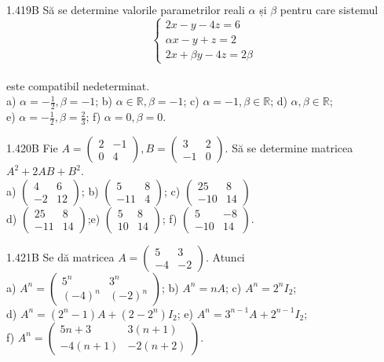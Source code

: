 \documentclass[11pt]{article}
\begin{document}
1.419B Să se determine valorile parametrilor reali $\alpha$ și $\beta$ pentru care sistemul $$\left\{\begin{array}{l}2 x-y-4 z=6 \\\alpha x-y+z=2 \\2 x+\beta y-4 z=2 \beta\end{array}\right.$$\\este compatibil nedeterminat.\\ a) $\alpha=-\frac{1}{2}, \beta=-1$; b) $\alpha \in \mathbb{R}, \beta=-1$; c) $\alpha=-1, \beta \in \mathbb{R}$; d) $\alpha, \beta \in \mathbb{R}$;\\ e) $\alpha=-\frac{1}{2}, \beta=\frac{2}{3}$; f) $\alpha=0, \beta=0$.

1.420B Fie $A=\left(\begin{array}{cc}2 & -1 \\ 0 & 4\end{array}\right), B=\left(\begin{array}{cc}3 & 2 \\ -1 & 0\end{array}\right)$. Să se determine matricea $A^{2}+2 A B+B^{2}$.\\ a) $\left(\begin{array}{cc}4 & 6 \\ -2 & 12\end{array}\right)$; b) $\left(\begin{array}{cc}5 & 8 \\ -11 & 4\end{array}\right)$; c) $\left(\begin{array}{cc}25 & 8 \\ -10 & 14\end{array}\right)$\\ d) $\left(\begin{array}{cc}25 & 8 \\ -11 & 14\end{array}\right)$;e) $\left(\begin{array}{cc}5 & 8 \\ 10 & 14\end{array}\right)$; f) $\left(\begin{array}{cc}5 & -8 \\ -10 & 14\end{array}\right)$.

1.421B Se dă matricea $A=\left(\begin{array}{cc}5 & 3 \\ -4 & -2\end{array}\right)$. Atunci\\ a) $A^{n}=\left(\begin{array}{cc}5^{n} & 3^{n} \\ (-4)^{n} & (-2)^{n}\end{array}\right)$; b) $A^{n}=n A$; c) $A^{n}=2^{n} I_{2}$;\\ d) $A^{n}=\left(2^{n}-1\right) A+\left(2-2^{n}\right) I_{2}$; e) $A^{n}=3^{n-1} A+2^{n-1} I_{2}$;\\ f) $A^{n}=\left(\begin{array}{cc}5 n+3 & 3(n+1) \\ -4(n+1) & -2(n+2)\end{array}\right)$.
\end{document}
